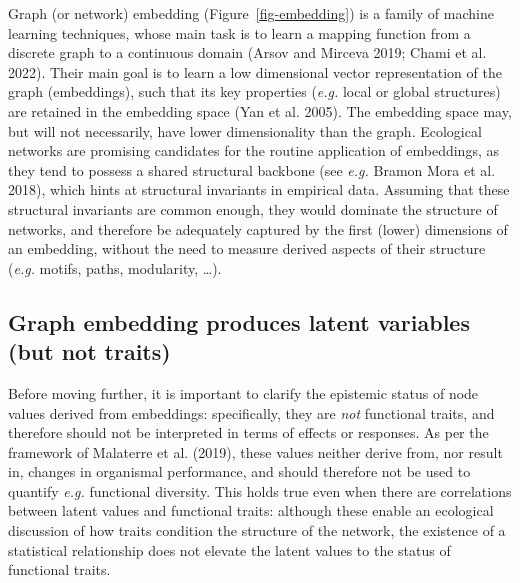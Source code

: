 \documentclass[
  letterpaper,
  DIV=11,
  numbers=noendperiod]{scrartcl}
\begin{document}
Graph (or network) embedding (Figure~\ref{fig-embedding}) is a family of
machine learning techniques, whose main task is to learn a mapping
function from a discrete graph to a continuous domain (Arsov and Mirceva
2019; Chami et al. 2022). Their main goal is to learn a low dimensional
vector representation of the graph (embeddings), such that its key
properties (\emph{e.g.} local or global structures) are retained in the
embedding space (Yan et al. 2005). The embedding space may, but will not
necessarily, have lower dimensionality than the graph. Ecological
networks are promising candidates for the routine application of
embeddings, as they tend to possess a shared structural backbone (see
\emph{e.g.} Bramon Mora et al. 2018), which hints at structural
invariants in empirical data. Assuming that these structural invariants
are common enough, they would dominate the structure of networks, and
therefore be adequately captured by the first (lower) dimensions of an
embedding, without the need to measure derived aspects of their
structure (\emph{e.g.} motifs, paths, modularity, \ldots).

\hypertarget{graph-embedding-produces-latent-variables-but-not-traits}{%
\subsection{Graph embedding produces latent variables (but not
traits)}\label{graph-embedding-produces-latent-variables-but-not-traits}}

Before moving further, it is important to clarify the epistemic status
of node values derived from embeddings: specifically, they are
\emph{not} functional traits, and therefore should not be interpreted in
terms of effects or responses. As per the framework of Malaterre et al.
(2019), these values neither derive from, nor result in, changes in
organismal performance, and should therefore not be used to quantify
\emph{e.g.} functional diversity. This holds true even when there are
correlations between latent values and functional traits: although these
enable an ecological discussion of how traits condition the structure of
the network, the existence of a statistical relationship does not
elevate the latent values to the status of functional traits.
\end{document}

